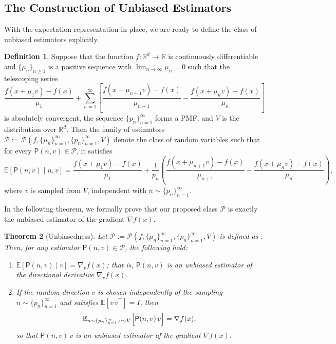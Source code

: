 \documentclass{article}
\newcommand{\EE}{\mathbb{E}}
\newcommand{\RR}{\mathbb{R}}
\theoremstyle{definition}
\newtheorem{definition}{Definition}[section]
\theoremstyle{plain}
\newtheorem{theorem}[definition]{Theorem}
\theoremstyle{remark}
\newtheorem*{remark}{Remark}
\begin{document}
\subsection{The Construction of Unbiased Estimators}
With the expectation representation in place, we are ready to define the class of unbiased estimators explicitly.  
\begin{definition} \label{def:unbiased-family}
Suppose that the function $f:\RR^d\to \RR$ is  continuously differentiable and  $\{\mu_n\}_{n\ge1}$ is a positive sequence with $\lim_{n\to\infty}\mu_n=0$ such that the telescoping series
\[
\frac{f(x+\mu_1 v)-f(x)}{\mu_1} + \sum_{n=1}^\infty \left[ \frac{f(x+\mu_{n+1} v)-f(x)}{\mu_{n+1}}-\frac{f(x+\mu_n v)-f(x)}{\mu_n}\right]
\]
is absolutely convergent, the sequence $\{p_n\}_{n=1}^\infty$ forms a PMF, and $V$ is the distribution over $\RR^d$. Then the family of estimators $\mathscr{P}:=\mathscr{P}(f, \{ \mu_n\}_{n=1}^\infty, \{ p_n\}_{n=1}^\infty,V)$ denote the class of random variables such that for every $\mathsf{P}(n,v) \in \mathscr{P}$, it satisfies
    $$\EE[\mathsf{P}(n,v)\mid n,v]= \frac{f(x+\mu_1 v) - f(x)}{\mu_1} + \frac{1}{p_n}\left( \frac{f(x+\mu_{n+1} v) - f(x)}{\mu_{n+1}} - \frac{f(x+\mu_n v) - f(x)}{\mu_n}\right),$$
    where $v$ is sampled from $V$,  independent with $n\sim \{ p_n\}_{n=1}^\infty$. 
\end{definition} 

In the following theorem, we formally prove that our proposed class $\mathscr{P}$ is exactly the unbiased estimator of the gradient $\nabla f(x)$. 
\begin{theorem}[Unbiasedness]\label{thm:unbiased}
Let $\mathscr{P}:=\mathscr{P}(f, \{ \mu_n\}_{n=1}^\infty, \{ p_n\}_{n=1}^\infty,V)$ is defined as . Then, for any estimator $\mathsf{P}(n,v) \in \mathscr{P}$, the following hold:
\begin{enumerate}[label=(\alph*)]
    \item \(\mathbb{E} [\mathsf{P}(n,v)\mid v] = \nabla_v f(x)\); that is, \(\mathsf{P}(n,v)\) is an unbiased estimator of the directional derivative $\nabla_v f(x)$.
    \item If the random direction \(v\) is chosen independently of the sampling $n\sim \{p_n\}_{n=1}^\infty $ and satisfies \(\mathbb{E}[v\,v^\top]=I\), then
    \[
    \mathbb{E}_{n\sim \{p_n\}_{n=1}^\infty , v\sim V}\Bigl[\mathsf{P}(n,v)\,v\Bigr] = \nabla f(x),
    \]
    so that \(\mathsf{P}(n,v)\,v\) is an unbiased estimator of the gradient $ \nabla f(x)$.
\end{enumerate}
\end{theorem}
\end{document}
